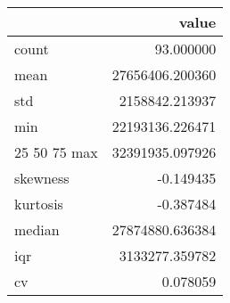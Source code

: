 \begin{tabular}{lr}
\toprule
 & value \\
\midrule
count & 93.000000 \\
mean & 27656406.200360 \\
std & 2158842.213937 \\
min & 22193136.226471 \\
25%
50%
75%
max & 32391935.097926 \\
skewness & -0.149435 \\
kurtosis & -0.387484 \\
median & 27874880.636384 \\
iqr & 3133277.359782 \\
cv & 0.078059 \\
\bottomrule
\end{tabular}
